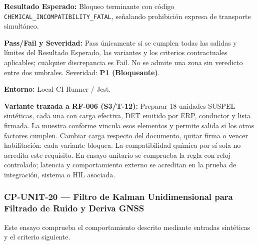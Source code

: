 \par\noindent\textbf{Resultado Esperado:} Bloqueo terminante con código \texttt{C\allowbreak{}H\allowbreak{}E\allowbreak{}M\allowbreak{}I\allowbreak{}C\allowbreak{}A\allowbreak{}L\allowbreak{}\_\allowbreak{}I\allowbreak{}N\allowbreak{}C\allowbreak{}O\allowbreak{}M\allowbreak{}P\allowbreak{}A\allowbreak{}T\allowbreak{}I\allowbreak{}B\allowbreak{}I\allowbreak{}L\allowbreak{}I\allowbreak{}T\allowbreak{}Y\allowbreak{}\_\allowbreak{}F\allowbreak{}A\allowbreak{}T\allowbreak{}A\allowbreak{}L\allowbreak{}}, señalando prohibición expresa de transporte simultáneo.\par
\par\noindent\textbf{Pass/Fail y Severidad:} Pass únicamente si se cumplen todas las salidas y límites del Resultado Esperado, las variantes y los criterios contractuales aplicables; cualquier discrepancia es Fail. No se admite una zona sin veredicto entre dos umbrales. Severidad: \textbf{P1 (Bloqueante)}.\par
\par\noindent\textbf{Entorno:} Local CI Runner / Jest.\par







\par\noindent\textbf{Variante trazada a RF-006 (S3/T-12):} Preparar 18 unidades SUSPEL sintéticas, cada una con carga efectiva, DET emitido por ERP, conductor y lista firmada. La muestra conforme vincula esos elementos y permite salida si los otros factores cumplen. Cambiar carga respecto del documento, quitar firma o vencer habilitación: cada variante bloquea. La compatibilidad química por sí sola no acredita este requisito. En ensayo unitario se comprueba la regla con reloj controlado; latencia y comportamiento externo se acreditan en la prueba de integración, sistema o HIL asociada.\par
\subsubsection*{CP-UNIT-20 — Filtro de Kalman Unidimensional para Filtrado de Ruido y Deriva GNSS}\label{sec:9-cp-unit-20}
Este ensayo comprueba el comportamiento descrito mediante entradas sintéticas y el criterio siguiente.

